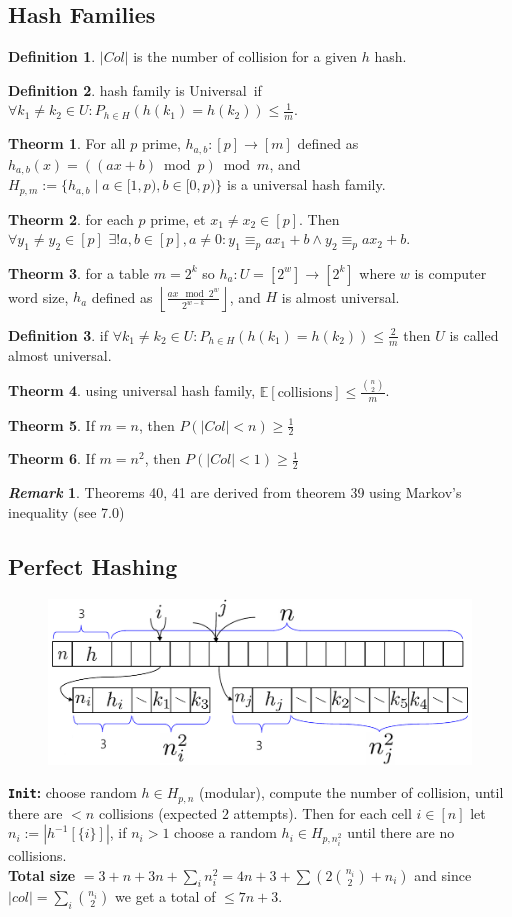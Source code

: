 \documentclass[]{article}
\newcommand\compactsubsection[1]        {\vspace{-10pt}\subsection{#1}\vspace{-6pt}}
\theoremstyle{definition}
\newtheorem{Theorem}{\color{theoColor}Theorm}
\newtheorem{Definition}{\color{defiColor}Definition}
\newtheorem{Remark}{\textit{Remark}}
\newcommand\theo  [1] {\begin{Theorem}#1\end{Theorem}}
\newcommand\defi  [1] {\begin{Definition}#1\end{Definition}}
\newcommand\E     {\mathbb{E}}
\newcommand\set   {\ell et \text{ }}
\newcommand\rf    {\right\rfloor}
\newcommand\lf    {\left\lfloor}
\newcommand\floor [1] {\lf #1 \rf}
\newcommand\co        {\colon}
\newcommand\op    {^{-1}}
\newcommand\sof[1]    {\left | #1 \right |}
\begin{document}
\begin{multicols}{4}
			\compactsubsection{Hash Families}
				\defi{$\sof{Col}$ is the number of collision for a given $h$ hash. }
				\defi{hash family is \color{defiColor}Universal\color{black}\, if $\forall k_1 \neq k_2 \in U \co P_{h \in H}(h(k_1) = h(k_2)) \le \frac{1}{m}$. }
				\theo{For all $p$ prime, $h_{a, b} \co [p] \to [m]$ defined as $h_{a, b}(x) = ((ax + b) \bmod p)\bmod m$, and $H_{p, m} := \{h_{a, b} \mid a \in [1, p), b \in [0, p)\}$ is a universal hash family. }
				\theo{for each $p$ prime, \set $x_1 \neq x_2 \in [p]$. Then $\forall y_1 \neq y_2 \in [p]\,\, \exists ! a, b \in [p], a \neq 0 \co y_1 \equiv_p ax_1 + b \land y_2 \equiv_p ax_2 + b$. }
				\theo{for a table $m = 2^{k}$ so $h_a \co U = [2^{w}] \to [2^{k}]$ where $w$ is computer word size, $h_a$ defined as $\floor{\frac{ax \mod 2^{w}}{2^{w - k}}}$, and $H$ is almost universal. }
				\defi{if $\forall k_1 \neq k_2 \in U \co P_{h \in H}(h(k_1) = h(k_2)) \le \frac{2}{m}$ then $U$ is called \color{defiColor}almost universal\color{black}. }
				\theo{using universal hash family, $\E[\text{collisions}] \le \frac{\binom{n}{2}}{m}$. }
				\theo{If $m = n$, then $P(|Col| < n) \ge \frac{1}{2}$}
				\theo{If $m = n^2$, then $P(|Col| < 1) \ge \frac{1}{2}$}
				\begin{Remark}
					Theorems 40, 41 are derived from theorem 39 using Markov's inequality (see 7.0)
				\end{Remark}
		
		
			\compactsubsection{Perfect Hashing}
				\begin{figure}
					\includegraphics[width=\linewidth]{images/perfectHash}
				\end{figure}
				\textbf{\texttt{Init}: }choose random $h \in H_{p, n}$ (modular), compute the number of collision, until there are $< n$ collisions (expected $2$ attempts). Then for each cell $i \in [n]$ let $n_i := \sof{h\op[\{i\}]}$, if $n_i > 1$ choose a random $h_i \in H_{p, n_i^2}$ until there are no collisions. \\
				\textbf{Total size }$=3 + n + 3n + \sum_i n_i^2 = 4n + 3 + \sum(2\binom{n_i}{2} + n_i)$ and since $|col| = \sum_i \binom{n_i}{2}$ we get a total of $\le 7n + 3$. 
				

\end{multicols}
\end{document}
